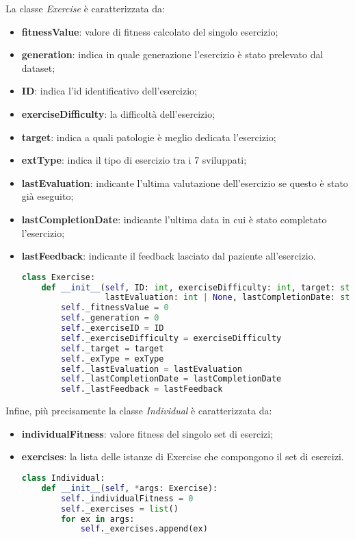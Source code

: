 \documentclass{article}
\begin{document}
\bigskip
\label{sec:exerciseImplementation}
La classe \textit{Exercise} è caratterizzata da:
\begin{itemize}
\item\textbf{fitnessValue}: valore di fitness calcolato del singolo esercizio;
\item\textbf{generation}: indica in quale generazione l'esercizio è stato prelevato dal dataset;
\item\textbf{ID}: indica l'id identificativo dell'esercizio;
\item\textbf{exerciseDifficulty}: la difficoltà dell'esercizio;
\item\textbf{target}: indica a quali patologie è meglio dedicata l'esercizio;
\item\textbf{extType}: indica il tipo di esercizio tra i 7 sviluppati;
\item\textbf{lastEvaluation}: indicante l'ultima valutazione dell'esercizio se questo è stato già eseguito;
\item\textbf{lastCompletionDate}: indicante l'ultima data in cui è stato completato l'esercizio;
\item\textbf{lastFeedback}: indicante il feedback lasciato dal paziente all'esercizio.

\begin{lstlisting}[language=Python]
    class Exercise:
    def __init__(self, ID: int, exerciseDifficulty: int, target: str, exType: str,
                 lastEvaluation: int | None, lastCompletionDate: str | None, lastFeedback: int | None):
        self._fitnessValue = 0
        self._generation = 0
        self._exerciseID = ID
        self._exerciseDifficulty = exerciseDifficulty
        self._target = target
        self._exType = exType
        self._lastEvaluation = lastEvaluation
        self._lastCompletionDate = lastCompletionDate
        self._lastFeedback = lastFeedback

\end{lstlisting}
\end{itemize}
\label{sec:individualImplementation}
Infine, più precisamente la classe \textit{Individual} è caratterizzata da:
\begin{itemize}
\item\textbf{individualFitness}: valore fitness del singolo set di esercizi;
\item\textbf{exercises}: la lista delle istanze di Exercise che compongono il set di esercizi.
\begin{lstlisting}[language = Python]
    class Individual:
    def __init__(self, *args: Exercise):
        self._individualFitness = 0
        self._exercises = list()
        for ex in args:
            self._exercises.append(ex)
\end{lstlisting}
\end{itemize}
\end{document}
